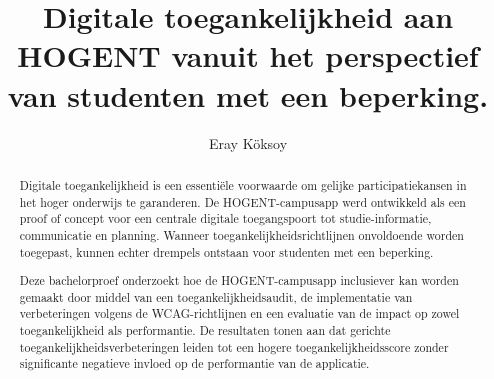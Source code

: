 \documentclass[a0,portrait]{hogent-poster}
\title{Digitale toegankelijkheid aan HOGENT vanuit het perspectief van studenten met een beperking.}
\author{Eray Köksoy}
\begin{document}
\maketitle

\begin{abstract}
Digitale toegankelijkheid is een essentiële voorwaarde om gelijke participatiekansen in het hoger onderwijs te garanderen. De HOGENT-campusapp werd ontwikkeld als een proof of concept voor een centrale digitale toegangspoort tot studie-informatie, communicatie en planning. Wanneer toegankelijkheidsrichtlijnen onvoldoende worden toegepast, kunnen echter drempels ontstaan voor studenten met een beperking.

Deze bachelorproef onderzoekt hoe de HOGENT-campusapp inclusiever kan worden gemaakt door middel van een toegankelijkheidsaudit, de implementatie van verbeteringen volgens de WCAG-richtlijnen en een evaluatie van de impact op zowel toegankelijkheid als performantie. De resultaten tonen aan dat gerichte toegankelijkheidsverbeteringen leiden tot een hogere toegankelijkheidsscore zonder significante negatieve invloed op de performantie van de applicatie.
\end{abstract}
\end{document}
